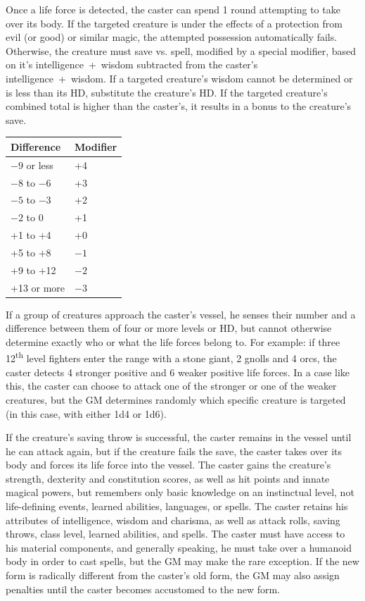\begin{multicols}{2}
Once a life force is detected, the caster can spend 1 round attempting to take over its body.  If the targeted creature is under the effects of a protection from evil (or good) or similar magic, the attempted possession automatically fails.  Otherwise, the creature must save vs. spell, modified by a special modifier, based on it's intelligence~+~wisdom subtracted from the caster's intelligence~+~wisdom.  If a targeted creature's wisdom cannot be determined or is less than its HD, substitute the creature's HD.  If the targeted creature's combined total is higher than the caster's, it results in a bonus to the creature's save.  

\noindent
\begin{tabular}{|p{}|p{}|}
\hline
Difference	& Modifier \\
\hline\hline
\rowcolor[gray]{.9}$-9$ or less	& +4 \\
$-8$ to $-6$	& +3 \\
\rowcolor[gray]{.9}$-5$ to $-3$	& +2 \\
$-2$ to 0	& +1 \\
\rowcolor[gray]{.9}+1 to +4	& +0 \\
+5 to +8	& $-1$ \\
\rowcolor[gray]{.9}+9 to +12	& $-2$ \\
+13 or more	& $-3$ \\
\hline
\end{tabular}

If a group of creatures approach the caster's vessel, he senses their number and a difference between them of four or more levels or HD, but cannot otherwise determine exactly who or what the life forces belong to.  For example: if three 12\textsuperscript{th} level fighters enter the range with a stone giant, 2 gnolls and 4 orcs, the caster detects 4 stronger positive and 6 weaker positive life forces.  In a case like this, the caster can choose to attack one of the stronger or one of the weaker creatures, but the GM determines randomly which specific creature is targeted (in this case, with either 1d4 or 1d6).  

If the creature's saving throw is successful, the caster remains in the vessel until he can attack again, but if the creature fails the save, the caster takes over its body and forces its life force into the vessel.  The caster gains the creature's strength, dexterity and constitution scores, as well as hit points and innate magical powers, but remembers only basic knowledge on an instinctual level, not life-defining events, learned abilities, languages, or spells.  The caster retains his attributes of intelligence, wisdom and charisma, as well as attack rolls, saving throws, class level, learned abilities, and spells.  The caster must have access to his material components, and generally speaking, he must take over a humanoid body in order to cast spells, but the GM may make the rare exception.  If the new form is radically different from the caster's old form, the GM may also assign penalties until the caster becomes accustomed to the new form. 


\end{multicols}
